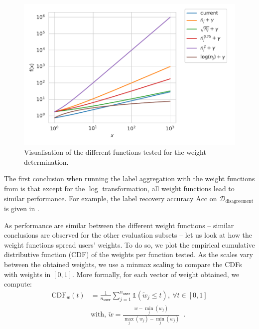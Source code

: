 \begin{figure}[htb]
    \centering
    \includegraphics[width=.7\textwidth]{./images_plantnet/weight_functions.pdf}
    \caption{Visualisation of the different functions tested for the weight determination.}
    \label{fig:weight_functions}
\end{figure}

The first conclusion when running the label aggregation with the weight functions from  is that except for the $\log$ transformation, all weight functions lead to similar performance.
For example, the label recovery accuracy $\mathrm{Acc}$ on $\mathcal{D}_\text{disagreement}$ is given in .

\begin{table}[htbp]
    \caption{Weight functions tested and the associated confidence threshold $\theta_\mathrm{conf}$.}
    \label{tab:res_disagreement_weights}
    \centering
\end{table}

As performance are similar between the different weight functions -- similar conclusions are observed for the other evaluation subsets -- let us look at how the weight functions spread users' weights.
To do so, we plot the empirical cumulative distributive function (CDF) of the weights per function tested.
As the scales vary between the obtained weights, we use a minmax scaling to compare the CDFs with weights in $[0,1]$. More formally, for each vector of weight obtained, we compute:
\begin{align*}
\mathrm{CDF}_w(t)&=\frac{1}{n_\texttt{user}}\sum_{j=1}^{n_\texttt{user}} \mathds{1}\left( \tilde{w}_j \leq t  \right),\ \forall t\in [0,1] \\
& \text{with, } \tilde{w} = \frac{w - \min_j(w_j)}{\max_j(w_j) - \min_j(w_j)}  \enspace.
\end{align*}

